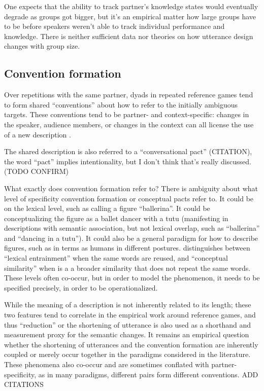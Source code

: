 \documentclass[]{article}
\begin{document}
One expects that the ability to track partner's knowledge states would eventually degrade as groups got bigger, but it's an empirical matter how large groups have to be before speakers weren't able to track individual performance and knowledge. There is neither sufficient data nor theories on how utterance design changes with group size. 


\subsection{Convention formation}
Over repetitions with the same partner, dyads in repeated reference games tend to form shared ``conventions'' about how to refer to the initially ambiguous targets. These conventions tend to be partner- and context-specific: changes in the speaker, audience members, or changes in the context can all license the use of a new description \cite{metzing2003a, ibarra2016, yoon2014}.

The shared description is also referred to a ``conversational pact'' (CITATION), the word ``pact'' implies intentionality, but I don't think that's really discussed. (TODO CONFIRM)

What exactly does convention formation refer to? There is ambiguity about what level of specificity convention formation or conceptual pacts refer to. 
It could be on the lexical level, such as calling a figure ``ballerina''. It could be conceptualizing the figure as a ballet dancer with a tutu (manifesting in descriptions with semantic association, but not lexical overlap, such as ``ballerina'' and ``dancing in a tutu''). It could also be a general paradigm for how to describe figures, such as in terms as humans in different postures.  \cite{horton2002a} distinguishes between ``lexical entrainment'' when the same words are reused, and ``conceptual similarity'' when is a a broader similarity that does not repeat the same words. These levels often co-occur, but in order to model the phenomenon, it needs to be specified precisely, in order to be operationalized. 

While the meaning of a description is not inherently related to its length; these two features tend to correlate in the empirical work around reference games, and thus ``reduction'' or the shortening of utterance is also used as a shorthand and measurement proxy for the semantic changes. It remains an empirical question whether the shortening of utterances and the convention formation are inherently coupled or merely occur together in the paradigms considered in the literature. These phenomena also co-occur and are sometimes conflated with partner-specificity, as in many paradigms, different pairs form different conventions. ADD CITATIONS
\end{document}
